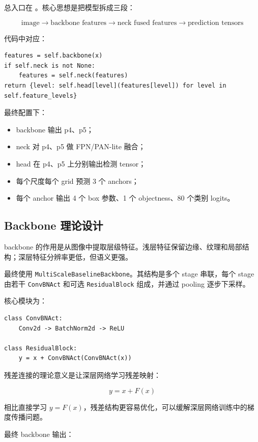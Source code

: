 \documentclass[11pt,a4paper]{article}
\newcommand{\code}[1]{\texttt{#1}}
\newcommand{\file}[1]{\path{#1}}
\begin{document}
总入口在 \file{models/detector.py}。核心思想是把模型拆成三段：

\[
\text{image} \rightarrow \text{backbone features} \rightarrow \text{neck fused features} \rightarrow \text{prediction tensors}
\]

代码中对应：

\begin{Verbatim}[fontsize=\small]
features = self.backbone(x)
if self.neck is not None:
    features = self.neck(features)
return {level: self.head[level](features[level]) for level in self.feature_levels}
\end{Verbatim}

最终配置下：

\begin{itemize}
  \item backbone 输出 p4、p5；
  \item neck 对 p4、p5 做 FPN/PAN-lite 融合；
  \item head 在 p4、p5 上分别输出检测 tensor；
  \item 每个尺度每个 grid 预测 3 个 anchors；
  \item 每个 anchor 输出 4 个 box 参数、1 个 objectness、80 个类别 logits。
\end{itemize}

\subsection{Backbone 理论设计}

backbone 的作用是从图像中提取层级特征。浅层特征保留边缘、纹理和局部结构；深层特征分辨率更低，但语义更强。

最终使用 \code{MultiScaleBaselineBackbone}。其结构是多个 stage 串联，每个 stage 由若干 \code{ConvBNAct} 和可选 \code{ResidualBlock} 组成，并通过 pooling 逐步下采样。

核心模块为：

\begin{Verbatim}[fontsize=\small]
class ConvBNAct:
    Conv2d -> BatchNorm2d -> ReLU

class ResidualBlock:
    y = x + ConvBNAct(ConvBNAct(x))
\end{Verbatim}

残差连接的理论意义是让深层网络学习残差映射：

\[
y = x + F(x)
\]

相比直接学习 $y=F(x)$，残差结构更容易优化，可以缓解深层网络训练中的梯度传播问题。

最终 backbone 输出：
\end{document}
